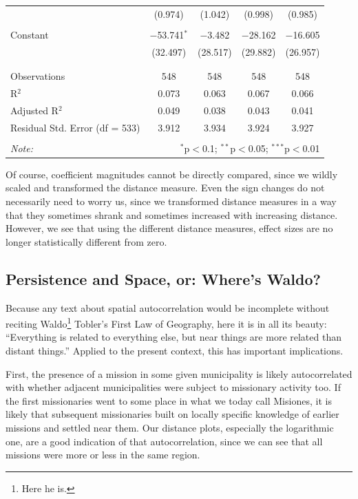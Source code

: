 \documentclass[
  a4paper,
]{article}
\begin{document}
\begin{center}
{\begin{tabular}{@{\extracolsep{5pt}}lcccc}
  & (0.974) & (1.042) & (0.998) & (0.985) \\ 
  & & & & \\ 
 Constant & $-$53.741$^{*}$ & $-$3.482 & $-$28.162 & $-$16.605 \\ 
  & (32.497) & (28.517) & (29.882) & (26.957) \\ 
  & & & & \\ 
\hline \\[-1.8ex] 
Observations & 548 & 548 & 548 & 548 \\ 
R$^{2}$ & 0.073 & 0.063 & 0.067 & 0.066 \\ 
Adjusted R$^{2}$ & 0.049 & 0.038 & 0.043 & 0.041 \\ 
Residual Std. Error (df = 533) & 3.912 & 3.934 & 3.924 & 3.927 \\ 
\hline 
\hline \\[-1.8ex] 
\textit{Note:}  & \multicolumn{4}{r}{$^{*}$p$<$0.1; $^{**}$p$<$0.05; $^{***}$p$<$0.01} \\ 
\end{tabular} 
}\end{center}

Of course, coefficient magnitudes cannot be directly compared, since we
wildly scaled and transformed the distance measure. Even the sign
changes do not necessarily need to worry us, since we transformed
distance measures in a way that they sometimes shrank and sometimes
increased with increasing distance. However, we see that using the
different distance measures, effect sizes are no longer statistically
different from zero.

\subsection{Persistence and Space, or: Where's
Waldo?}\label{persistence-and-space-or-wheres-waldo}

Because any text about spatial autocorrelation would be incomplete
without reciting Waldo\footnote{Here he is.} Tobler's First Law of
Geography, here it is in all its beauty: ``Everything is related to
everything else, but near things are more related than distant things.''
Applied to the present context, this has important implications.

First, the presence of a mission in some given municipality is likely
autocorrelated with whether adjacent municipalities were subject to
missionary activity too. If the first missionaries went to some place in
what we today call Misiones, it is likely that subsequent missionaries
built on locally specific knowledge of earlier missions and settled near
them. Our distance plots, especially the logarithmic one, are a good
indication of that autocorrelation, since we can see that all missions
were more or less in the same region.
\end{document}
